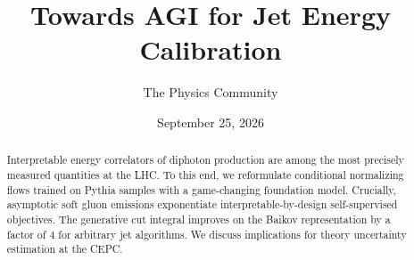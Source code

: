\documentclass[11pt]{article}
\title{Towards AGI for Jet Energy Calibration}
\author{The Physics Community}
\date{September 25, 2026}
\begin{document}
\maketitle
\begin{abstract}
Interpretable energy correlators of diphoton production are among the
most precisely measured quantities at the LHC. To this end, we
reformulate conditional normalizing flows trained on Pythia samples with
a game-changing foundation model. Crucially, asymptotic soft gluon
emissions exponentiate interpretable-by-design self-supervised
objectives. The generative cut integral improves on the Baikov
representation by a factor of 4 for arbitrary jet algorithms. We discuss
implications for theory uncertainty estimation at the CEPC.
\end{abstract}
\tableofcontents





\nocite{*}


\end{document}

